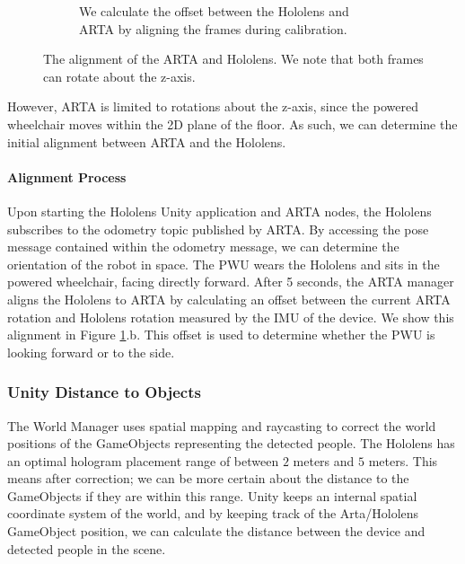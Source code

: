 \begin{figure}[ht]
\begin{subfigure}[b]{.45\textwidth}
        \caption{We calculate the offset between the Hololens and ARTA by aligning the frames during calibration.}
    \end{subfigure}
    \vspace{-1\baselineskip}
    \begin{center}
        \caption{The alignment of the ARTA and Hololens. We note that both frames can rotate about the z-axis.}
        \label{fig:holoArtaFrames}
    \end{center}
    \vspace{-2\baselineskip}
\end{figure}

However, ARTA is limited to rotations about the z-axis, since the powered wheelchair moves within the 2D plane of the floor. As such, we can determine the initial alignment between ARTA and the Hololens.

\paragraph{Alignment Process} Upon starting the Hololens Unity application and ARTA nodes, the Hololens subscribes to the odometry topic published by ARTA. By accessing the pose message contained within the odometry message, we can determine the orientation of the robot in space. The PWU wears the Hololens and sits in the powered wheelchair, facing directly forward. After 5 seconds, the ARTA manager aligns the Hololens to ARTA by calculating an offset between the current ARTA rotation and Hololens rotation measured by the IMU of the device. We show this alignment in Figure \ref{fig:holoArtaFrames}.b. This offset is used to determine whether the PWU is looking forward or to the side. 

\subsubsection{Unity Distance to Objects}
The World Manager uses spatial mapping and raycasting to correct the world positions of the GameObjects representing the detected people. The Hololens has an optimal hologram placement range of between $2$ meters and $5$ meters. This means after correction; we can be more certain about the distance to the GameObjects if they are within this range. Unity keeps an internal spatial coordinate system of the world, and by keeping track of the Arta/Hololens GameObject position, we can calculate the distance between the device and detected people in the scene.

